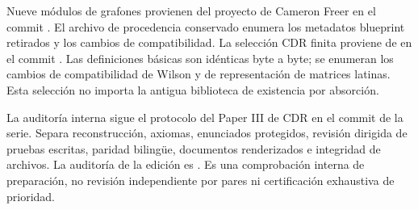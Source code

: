 \documentclass[spanish,11pt,a4paper]{article}
\begin{document}
Nueve módulos de grafones provienen del proyecto de Cameron Freer en el commit . El archivo de procedencia conservado enumera los metadatos blueprint retirados y los cambios de compatibilidad. La selección CDR finita proviene de  en el commit . Las definiciones básicas son idénticas byte a byte; se enumeran los cambios de compatibilidad de Wilson y de representación de matrices latinas. Esta selección no importa la antigua biblioteca de existencia por absorción.

La auditoría interna sigue el protocolo del Paper III de CDR en el commit  de la serie. Separa reconstrucción, axiomas, enunciados protegidos, revisión dirigida de pruebas escritas, paridad bilingüe, documentos renderizados e integridad de archivos. La auditoría de la edición es . Es una comprobación interna de preparación, no revisión independiente por pares ni certificación exhaustiva de prioridad.
\end{document}
